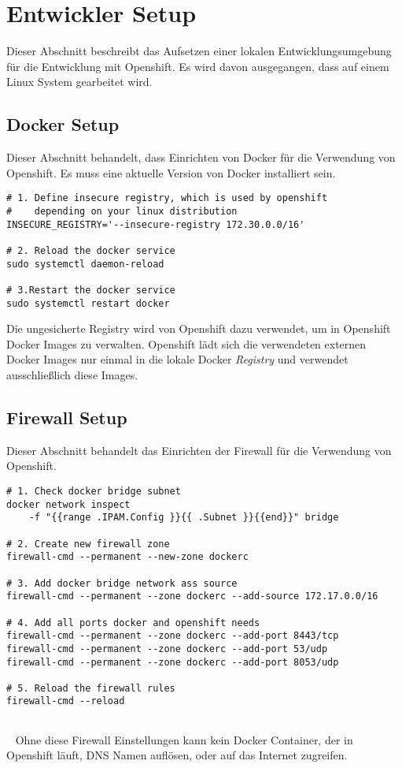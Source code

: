 \section{Entwickler Setup}
\label{sec:dev-setup}
Dieser Abschnitt beschreibt das Aufsetzen einer lokalen Entwicklungsumgebung für die Entwicklung mit Openshift. Es wird davon ausgegangen, dass auf einem Linux System gearbeitet wird.

\subsection{Docker Setup}
Dieser Abschnitt behandelt, dass Einrichten von Docker für die Verwendung von Openshift. Es muss eine aktuelle Version von Docker installiert sein.

\begin{verbatim}
# 1. Define insecure registry, which is used by openshift
#    depending on your linux distribution
INSECURE_REGISTRY='--insecure-registry 172.30.0.0/16'

# 2. Reload the docker service
sudo systemctl daemon-reload

# 3.Restart the docker service
sudo systemctl restart docker
\end{verbatim} 
Die ungesicherte Registry wird von Openshift dazu verwendet, um in Openshift Docker Images zu verwalten. Openshift lädt sich die verwendeten externen Docker Images nur einmal in die lokale Docker \emph{Registry} und verwendet ausschließlich diese Images.

\subsection{Firewall Setup}
Dieser Abschnitt behandelt das Einrichten der Firewall für die Verwendung von Openshift.

\begin{verbatim}
# 1. Check docker bridge subnet
docker network inspect 
	-f "{{range .IPAM.Config }}{{ .Subnet }}{{end}}" bridge

# 2. Create new firewall zone
firewall-cmd --permanent --new-zone dockerc

# 3. Add docker bridge network ass source
firewall-cmd --permanent --zone dockerc --add-source 172.17.0.0/16

# 4. Add all ports docker and openshift needs
firewall-cmd --permanent --zone dockerc --add-port 8443/tcp
firewall-cmd --permanent --zone dockerc --add-port 53/udp
firewall-cmd --permanent --zone dockerc --add-port 8053/udp

# 5. Reload the firewall rules
firewall-cmd --reload
	
\end{verbatim}
\ \newline
Ohne diese Firewall Einstellungen kann kein Docker Container, der in Openshift läuft, DNS Namen auflösen, oder auf das Internet zugreifen.

